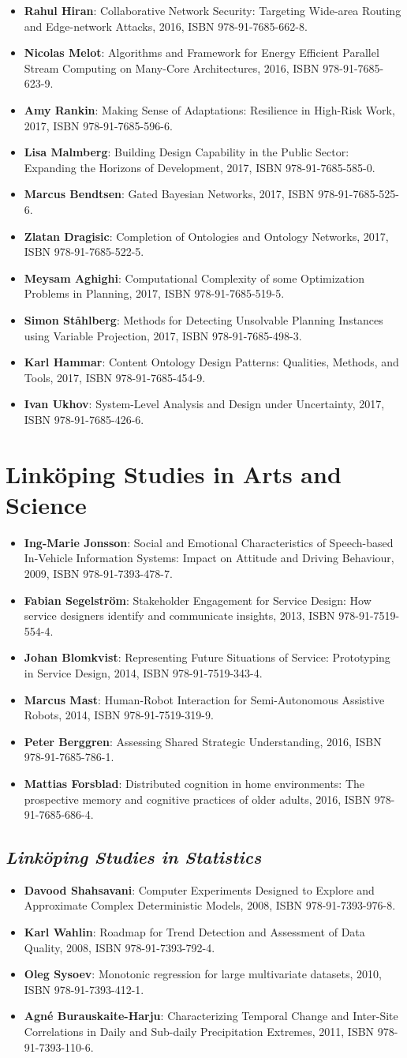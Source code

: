 \documentclass[a4paper,showtrims,twocolumn]{memoir}
\newcommand{\series}[1]{\section*{\footnotesize #1}}
\newcommand{\subseries}[1]{\subsection*{\footnotesize\normalfont\textit{#1}}}
\newenvironment{theses}
  {
    \begin{itemize}
      \setlength{\itemsep}{0.2em}
      \setlength{\parskip}{0em}
      \setlength{\parsep}{0em}
  }
  {
    \end{itemize}
  }
\newcommand{\thesis}[5]{\item[No. #1] \textbf{#2}: #3, #4, ISBN #5.}
\begin{document}
\begin{theses}
    \thesis{1798}{Rahul Hiran}{Collaborative Network Security: Targeting Wide-area Routing and Edge-network Attacks}{2016}{978-91-7685-662-8}
    \thesis{1813}{Nicolas Melot}{Algorithms and Framework for Energy Efficient Parallel Stream Computing on Many-Core Architectures}{2016}{978-91-7685-623-9}
    \thesis{1823}{Amy Rankin}{Making Sense of Adaptations: Resilience in High-Risk Work}{2017}{978-91-7685-596-6}
    \thesis{1831}{Lisa Malmberg}{Building Design Capability in the Public Sector: Expanding the Horizons of Development}{2017}{978-91-7685-585-0}
    \thesis{1851}{Marcus Bendtsen}{Gated Bayesian Networks}{2017}{978-91-7685-525-6}
    \thesis{1852}{Zlatan Dragisic}{Completion of Ontologies and Ontology Networks}{2017}{978-91-7685-522-5}
    \thesis{1854}{Meysam Aghighi}{Computational Complexity of some Optimization Problems in Planning}{2017}{978-91-7685-519-5}
    \thesis{1863}{Simon Ståhlberg}{Methods for Detecting Unsolvable Planning Instances using Variable Projection}{2017}{978-91-7685-498-3}
    \thesis{1879}{Karl Hammar}{Content Ontology Design Patterns: Qualities, Methods, and Tools}{2017}{978-91-7685-454-9}
    \thesis{1887}{Ivan Ukhov}{System-Level Analysis and Design under Uncertainty}{2017}{978-91-7685-426-6}
    \end{theses}

  \series{Linköping Studies in Arts and Science}

  \begin{theses}
    \thesis{504}{Ing-Marie Jonsson}{Social and Emotional Characteristics of Speech-based In-Vehicle Information Systems: Impact on Attitude and Driving Behaviour}{2009}{978-91-7393-478-7}
    \thesis{586}{Fabian Segelström}{Stakeholder Engagement for Service Design: How service designers identify and communicate insights}{2013}{978-91-7519-554-4}
    \thesis{618}{Johan Blomkvist}{Representing Future Situations of Service: Prototyping in Service Design}{2014}{978-91-7519-343-4}
    \thesis{620}{Marcus Mast}{Human-Robot Interaction for Semi-Autonomous Assistive Robots}{2014}{978-91-7519-319-9}
    \thesis{677}{Peter Berggren}{Assessing Shared Strategic Understanding}{2016}{978-91-7685-786-1}
    \thesis{695}{Mattias Forsblad}{Distributed cognition in home environments: The prospective memory and cognitive practices of older adults}{2016}{978-91-7685-686-4}
  \end{theses}

  \subseries{Linköping Studies in Statistics}

  \begin{theses}
    \thesis{9}{Davood Shahsavani}{Computer Experiments Designed to Explore and Approximate Complex Deterministic Models}{2008}{978-91-7393-976-8}
    \thesis{10}{Karl Wahlin}{Roadmap for Trend Detection and Assessment of Data Quality}{2008}{978-91-7393-792-4}
    \thesis{11}{Oleg Sysoev}{Monotonic regression for large multivariate datasets}{2010}{978-91-7393-412-1}
    \thesis{13}{Agné Burauskaite-Harju}{Characterizing Temporal Change and Inter-Site Correlations in Daily and Sub-daily Precipitation Extremes}{2011}{978-91-7393-110-6}
  \end{theses}
\end{document}

